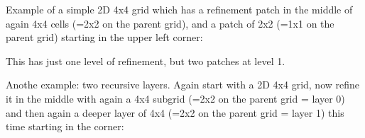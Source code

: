 \documentclass[letterpaper,10pt,english]{sphinxmanual}
\begin{document}
Example of a simple 2\sphinxhyphen{}D 4x4 grid which has a refinement patch in the middle
of again 4x4 cells (=2x2 on the parent grid), and a patch of 2x2 (=1x1 on
the parent grid) starting in the upper left corner:

\begin{sphinxVerbatim}[commandchars=\\\{\}]
    
    
  
    
    
 
            
            
\end{sphinxVerbatim}

This has just one level of refinement, but two patches at level 1.

Anothe example: two recursive layers. Again start with a 2\sphinxhyphen{}D 4x4 grid,
now refine it in the middle with again a 4x4 sub\sphinxhyphen{}grid (=2x2 on the parent
grid = layer 0) and then again a deeper layer of 4x4 (=2x2 on the
parent grid = layer 1) this time starting in the corner:

\begin{sphinxVerbatim}[commandchars=\\\{\}]
    
    
  
    
    
 
            
            
\end{sphinxVerbatim}
\end{document}
